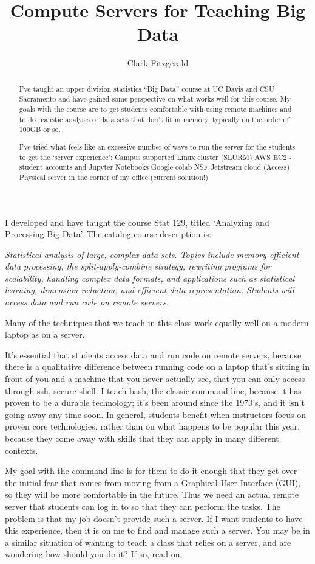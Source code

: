 \documentclass{article}
\title{Compute Servers for Teaching Big Data}
\author{Clark Fitzgerald}
\begin{document}
\maketitle

\begin{abstract}

I've taught an upper division statistics ``Big Data'' course at UC Davis and CSU Sacramento and have gained some perspective on what works well for this course.
My goals with the course are to get students comfortable with using remote machines and to do realistic analysis of data sets that don’t fit in memory, typically on the order of 100GB or so.
 
I’ve tried what feels like an excessive number of ways to run the server for the students to get the `server experience':
Campus supported Linux cluster (SLURM)
AWS EC2 - student accounts and Jupyter Notebooks
Google colab
NSF Jetstream cloud (Access)
Physical server in the corner of my office (current solution!)

\end{abstract}

I developed and have taught the course Stat 129, titled `Analyzing and Processing Big Data'.
The catalog course description is:

\emph{
Statistical analysis of large, complex data sets. Topics include memory efficient data processing, the split-apply-combine strategy, rewriting programs for scalability, handling complex data formats, and applications such as statistical learning, dimension reduction, and efficient data representation. Students will access data and run code on remote servers.
}


Many of the techniques that we teach in this class work equally well on a modern laptop as on a server.

It's essential that students access data and run code on remote servers, because there is a qualitative difference between running code on a laptop that's sitting in front of you and a machine that you never actually see, that you can only access through ssh, secure shell.
I teach bash, the classic command line, because it has proven to be a durable technology; it's been around since the 1970's, and it isn't going away any time soon.
In general, students benefit when instructors focus on proven core technologies, rather than on what happens to be popular this year, because they come away with skills that they can apply in many different contexts.

My goal with the command line is for them to do it enough that they get over the initial fear that comes from moving from a Graphical User Interface (GUI), so they will be more comfortable in the future.
Thus we need an actual remote server that students can log in to so that they can perform the tasks.
The problem is that my job doesn't provide such a server.
If I want students to have this experience, then it is on me to find and manage such a server.
You may be in a similar situation of wanting to teach a class that relies on a server, and are wondering how should you do it?
If so, read on.
\end{document}
